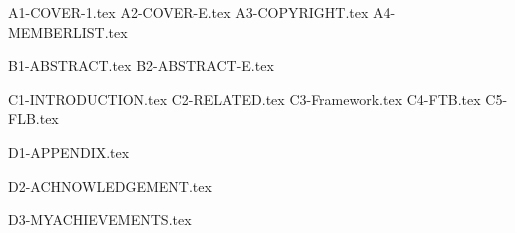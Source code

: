 \documentclass[12pt,openany,a4paper,fancyhdr,oneside]{ctexbook}
\newcommand{\loflabel}{图}%
\newcommand{\lotlabel}{表}
\begin{document}
 {A1-COVER-1.tex}%
 {A2-COVER-E.tex}%
 {A3-COPYRIGHT.tex}%
 {A4-MEMBERLIST.tex}%


\newpage
{}
\pagestyle{plain}
 {B1-ABSTRACT.tex} %
 {B2-ABSTRACT-E.tex}%
\setcounter{secnumdepth}{3}

\setcounter{tocdepth}{2}
\tableofcontents



\renewcommand{\numberline}[1]{\loflabel~#1\hspace*{1em}}%
\listoffigures%

\renewcommand{\numberline}[1]{\lotlabel~#1\hspace*{1em}}
\listoftables




\newpage
{}
\pagestyle{fancy}


\setlength{\baselineskip}{25pt}  %

 {C1-INTRODUCTION.tex}  %
 {C2-RELATED.tex}
 {C3-Framework.tex}
 {C4-FTB.tex}
 {C5-FLB.tex}



\clearpage



%

\begin{spacing}{1.2}


\end{spacing}
\clearpage
\phantom{s}
\clearpage

\pagestyle{plain}\clearpage
\pagestyle{plain}
\clearpage
{}
 {D1-APPENDIX.tex} %
\pagestyle{plain}
\clearpage
{}
{}
 {D2-ACHNOWLEDGEMENT.tex} %




 {D3-MYACHIEVEMENTS.tex}


\printindex
\end{document}
